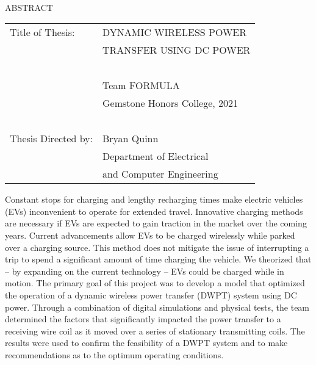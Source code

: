 
\hbox{\ }

\renewcommand{\baselinestretch}{1}
\small \normalsize

\begin{center}
\large{{ABSTRACT}}

\vspace{3em}

\end{center}
\hspace{-.15in}
\begin{tabular}{ll}
Title of Thesis:    & {\large  DYNAMIC WIRELESS POWER }\\
&                     {\large  TRANSFER USING DC POWER} \\
\ \\
&                          {\large  Team FORMULA} \\
&                           {\large Gemstone Honors College, 2021} \\
\ \\
Thesis Directed by: & {\large  Bryan Quinn} \\
&               {\large  Department of Electrical } \\
&               {\large  and Computer Engineering } \\
\end{tabular}

\vspace{3em}

\renewcommand{\baselinestretch}{2}
\large \normalsize
Constant stops for charging and lengthy recharging times make electric vehicles (EVs) inconvenient to operate for extended travel. Innovative charging methods are necessary if EVs are expected to gain traction in the market over the coming years. Current advancements allow EVs to be charged wirelessly while parked over a charging source. This method does not mitigate the issue of interrupting a trip to spend a significant amount of time charging the vehicle. We theorized that – by expanding on the current technology – EVs could be charged while in motion. The primary goal of this project was to develop a model that optimized the operation of a dynamic wireless power transfer (DWPT) system using DC power. Through a combination of digital simulations and physical tests, the team determined the factors that significantly impacted the power transfer to a receiving wire coil as it moved over a series of stationary transmitting coils. The results were used to confirm the feasibility of a DWPT system and to make recommendations as to the optimum operating conditions. 